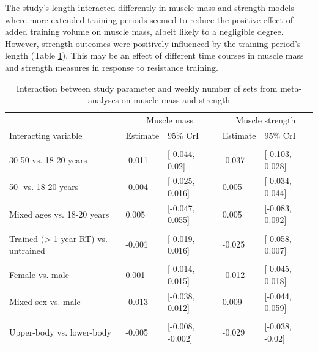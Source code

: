 \documentclass[twoside,10pt]{gihclass} %
\begin{document}
The study's length interacted differently in muscle mass and strength models where more extended training periods seemed to reduce the positive effect of added training volume on muscle mass, albeit likely to a negligible degree. However, strength outcomes were positively influenced by the training period's length (Table \ref{tab:meta-interaction-table}). This may be an effect of different time courses in muscle mass and strength measures in response to resistance training.
\begin{table}

\caption{\label{tab:meta-interaction-table}Interaction between study parameter and weekly number of sets from meta-analyses on muscle mass and strength}
\centering
\fontsize{7}{9}\selectfont
\begin{tabular}[t]{lllll}
\toprule
\multicolumn{1}{c}{ } & \multicolumn{2}{c}{Muscle mass} & \multicolumn{2}{c}{Muscle strength} \\
\cmidrule(l{3pt}r{3pt}){2-3} \cmidrule(l{3pt}r{3pt}){4-5}
Interacting variable & Estimate & 95\% CrI & Estimate & 95\% CrI\\
\midrule
\addlinespace[0.3em]
\multicolumn{5}{l}{\textbf{Age}}\\
\hspace{1em}30-50 vs. 18-20 years & -0.011 & [-0.044, 0.02] & -0.037 & [-0.103, 0.028]\\
\hspace{1em}50- vs. 18-20 years & -0.004 & [-0.025, 0.016] & 0.005 & [-0.034, 0.044]\\
\hspace{1em}Mixed ages vs. 18-20 years & 0.005 & [-0.047, 0.055] & 0.005 & [-0.083, 0.092]\\
\addlinespace[0.3em]
\multicolumn{5}{l}{\textbf{Training status}}\\
\hspace{1em}Trained (> 1 year RT) vs. untrained & -0.001 & [-0.019, 0.016] & -0.025 & [-0.058, 0.007]\\
\addlinespace[0.3em]
\multicolumn{5}{l}{\textbf{Sex}}\\
\hspace{1em}Female vs. male & 0.001 & [-0.014, 0.015] & -0.012 & [-0.045, 0.018]\\
\hspace{1em}Mixed sex vs. male & -0.013 & [-0.038, 0.012] & 0.009 & [-0.044, 0.059]\\
\addlinespace[0.3em]
\multicolumn{5}{l}{\textbf{Body portion}}\\
\hspace{1em}Upper-body vs. lower-body & -0.005 & [-0.008, -0.002] & -0.029 & [-0.038, -0.02]\\

\end{tabular}
\end{table}
\end{document}
